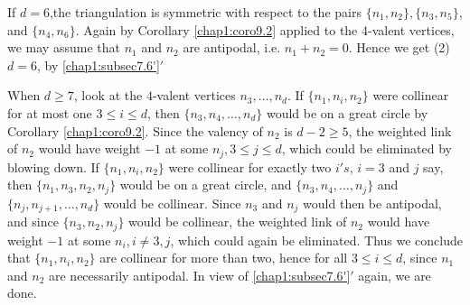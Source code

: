  	If $d=6$,\pageoriginale the triangulation is symmetric with
        respect to the 
        pairs $\{n_1, n_2\}, \{n_3, n_5\}$, and $\{n_4, n_6\}$. Again
        by Corollary \ref{chap1:coro9.2} applied to the 4-valent vertices, we may
        assume that $n_1$ and $n_2$ are antipodal,
        i.e. $n_1+n_2=0$. Hence we get (2) $d=6$, by \ref{chap1:subsec7.6'}$'$  

 \noindent
 When $d \geq 7$, look at the $4$-valent vertices $n_3, \dots,
 n_d$. If $\{n_1, n_i, n_2\}$ were collinear for at most one $3 \leq i
 \leq d$, then $\{n_3, n_4, \dots , n_d\}$ would be on a great circle
 by Corollary \ref{chap1:coro9.2}. Since the valency of $n_2$ is $d-2 \geq 5$, the
 weighted link of $n_2$ would have weight $-1$ at some $n_j, 3
 \leqslant j \leqslant d$, which could be eliminated by blowing
 down. If $\{n_1, n_i, n_2\}$ were collinear for exactly two $i's$,
 $i=3$ and $j$ say, then $\{n_1, n_3, n_2, n_j\}$ would be on a great
 circle, and $\{n_3, n_4, \ldots , n_j\}$ and $\{n_j, n_{j+1}, \ldots,
 n_d\}$ would be collinear. Since $n_3$ and $n_j$ would then be
 antipodal, and since $\{n_3, n_2, n_j\}$ would be collinear, the
 weighted link of $n_2$ would have weight $-1$ at some $n_i, i \neq 3,
 j$, which could again be eliminated. Thus we conclude that $\{n_1,
 n_i, n_2\}$ are collinear for more than two, hence for all $3 \leq i
 \leq d$, since $n_1$ and $n_2$ are necessarily antipodal. In view of
\ref{chap1:subsec7.6'}$'$  again, we are done.  

